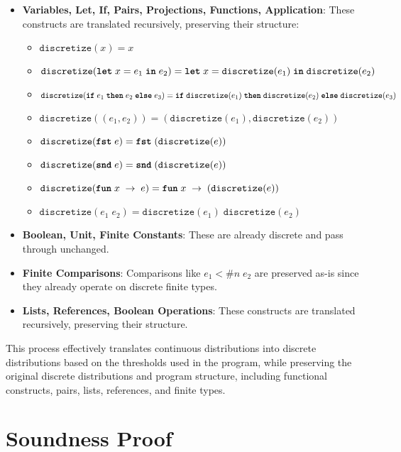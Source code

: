 \documentclass[acmsmall,screen,dvipsnames,x11names,nonacm,anonymous,review]{acmart}
\begin{document}
\begin{itemize}
    \item \textbf{Variables, Let, If, Pairs, Projections, Functions, Application}: These constructs are translated recursively, preserving their structure:
    \begin{itemize}
        \item $\texttt{discretize}(x) = x$
        \item $\texttt{discretize}(\text{\ttfamily\bfseries let} \; x = e_1 \; \text{\ttfamily\bfseries in} \; e_2) = \text{\ttfamily\bfseries let} \; x = \texttt{discretize}(e_1) \; \text{\ttfamily\bfseries in} \; \texttt{discretize}(e_2)$
        \item $\texttt{discretize}(\text{\ttfamily\bfseries if} \; e_1 \; \text{\ttfamily\bfseries then} \; e_2 \; \text{\ttfamily\bfseries else} \; e_3) = \text{\ttfamily\bfseries if} \; \texttt{discretize}(e_1) \; \text{\ttfamily\bfseries then} \; \texttt{discretize}(e_2) \; \text{\ttfamily\bfseries else} \; \texttt{discretize}(e_3)$
        \item $\texttt{discretize}((e_1, e_2)) = (\texttt{discretize}(e_1), \texttt{discretize}(e_2))$
        \item $\texttt{discretize}(\text{\ttfamily\bfseries fst} \; e) = \text{\ttfamily\bfseries fst} \; (\texttt{discretize}(e))$
        \item $\texttt{discretize}(\text{\ttfamily\bfseries snd} \; e) = \text{\ttfamily\bfseries snd} \; (\texttt{discretize}(e))$
        \item $\texttt{discretize}(\text{\ttfamily\bfseries fun} \; x \; \rightarrow \; e) = \text{\ttfamily\bfseries fun} \; x \; \rightarrow \; (\texttt{discretize}(e))$
        \item $\texttt{discretize}(e_1 \; e_2) = \texttt{discretize}(e_1) \; \texttt{discretize}(e_2)$
    \end{itemize}

    \item \textbf{Boolean, Unit, Finite Constants}: These are already discrete and pass through unchanged.
    \item \textbf{Finite Comparisons}: Comparisons like $e_1 <\#n\; e_2$ are preserved as-is since they already operate on discrete finite types.
    \item \textbf{Lists, References, Boolean Operations}: These constructs are translated recursively, preserving their structure.
\end{itemize}

This process effectively translates continuous distributions into discrete distributions based on the thresholds used in the program, while preserving the original discrete distributions and program structure, including functional constructs, pairs, lists, references, and finite types.

\section{Soundness Proof}\label{sec:soundness}
\end{document}
